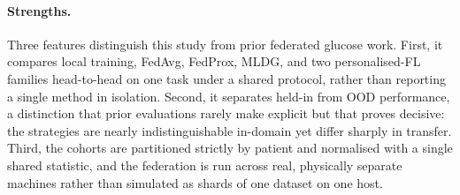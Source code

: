 \documentclass[10pt,letterpaper]{article}
\begin{document}
\paragraph{Strengths.} Three features distinguish this study from prior federated
glucose work. First, it compares local training, FedAvg, FedProx, MLDG, and two
personalised-FL families head-to-head on one task under a shared protocol, rather
than reporting a single method in isolation. Second, it separates held-in from
OOD performance, a distinction that prior evaluations rarely make explicit but
that proves decisive: the strategies are nearly indistinguishable in-domain yet
differ sharply in transfer. Third, the cohorts are partitioned strictly by
patient and normalised with a single shared statistic, and the federation is run
across real, physically separate machines rather than simulated as shards of one
dataset on one host.
\end{document}
